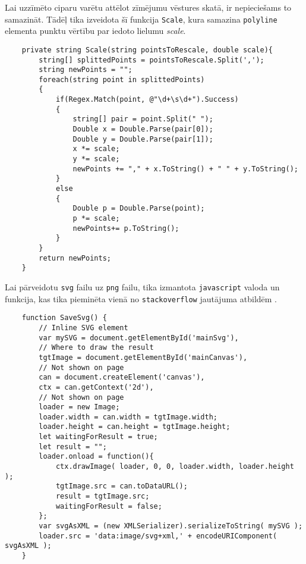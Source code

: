 \par Lai uzzīmēto ciparu varētu attēlot zīmējumu vēstures skatā, ir nepieciešams to samazināt. Tādēļ tika izveidota šī funkcija \texttt{Scale}, kura samazina \texttt{polyline} elementa punktu vērtību par iedoto lielumu \textit{scale}.
{
\begin{verbatim}
    private string Scale(string pointsToRescale, double scale){
        string[] splittedPoints = pointsToRescale.Split(',');
        string newPoints = "";
        foreach(string point in splittedPoints)
        {
            if(Regex.Match(point, @"\d+\s\d+").Success)
            {
                string[] pair = point.Split(" ");
                Double x = Double.Parse(pair[0]);
                Double y = Double.Parse(pair[1]);
                x *= scale;
                y *= scale;
                newPoints += "," + x.ToString() + " " + y.ToString();
            }
            else
            {
                Double p = Double.Parse(point);
                p *= scale;
                newPoints+= p.ToString();
            }
        }
        return newPoints;
    }
\end{verbatim}
}

\par Lai pārveidotu \texttt{svg} failu uz \texttt{png} failu, tika izmantota \texttt{javascript} valoda un funkcija, kas tika pieminēta vienā no \texttt{stackoverflow} jautājuma atbildēm \cite{stackoverflow_answer}.

{
\begin{verbatim}
    function SaveSvg() {
        // Inline SVG element
        var mySVG = document.getElementById('mainSvg'),
        // Where to draw the result
        tgtImage = document.getElementById('mainCanvas'),
        // Not shown on page
        can = document.createElement('canvas'),
        ctx = can.getContext('2d'),
        // Not shown on page
        loader = new Image;
        loader.width = can.width = tgtImage.width;
        loader.height = can.height = tgtImage.height;
        let waitingForResult = true;
        let result = "";
        loader.onload = function(){
            ctx.drawImage( loader, 0, 0, loader.width, loader.height );
            tgtImage.src = can.toDataURL();
            result = tgtImage.src;
            waitingForResult = false;
        };
        var svgAsXML = (new XMLSerializer).serializeToString( mySVG );
        loader.src = 'data:image/svg+xml,' + encodeURIComponent( svgAsXML );
    }
\end{verbatim}
}

